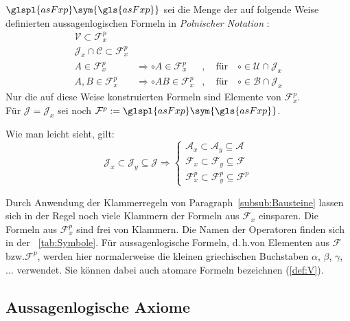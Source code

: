 \documentclass[english,ngerman,parskip=half,headsepline,footsepline,
	fleqn,notitlepage]{scrreprt}
\makeatletter
\newcommand*{\metaimp}{\Rightarrow}%
\newcommand*{\defeq}{:=}%
\newcommand*{\asA}{\mathcal{A}}%
\newcommand*{\asAx}{\mathcal{A}_x}%
\newcommand*{\asAy}{\mathcal{A}_y}%
\newcommand*{\asB}{\mathcal{B}}%
\newcommand*{\asC}{\mathcal{C}}%
\newcommand*{\asF}{\mathcal{F}}%
\newcommand*{\asFp}{\mathcal{F}^p}%
\newcommand*{\asFx}{\mathcal{F}_x}%
\newcommand*{\asFxp}{\mathcal{F}_x^p}%
\newcommand*{\asFy}{\mathcal{F}_y}%
\newcommand*{\asFyp}{\mathcal{F}_y^p}%
\newcommand*{\asJ}{\mathcal{J}}%
\newcommand*{\asJx}{\mathcal{J}_x}%
\newcommand*{\asJy}{\mathcal{J}_y}%
\newcommand*{\asU}{\mathcal{U}}%
\newcommand*{\asV}{\mathcal{V}}%
\newcommand*{\subsubsectionname}{Paragraph}
\newcommand*{\textbzw}{bzw.\@ }
\newcommand*{\textdh}{d.\@\,h.\@ }
\newcommand*{\glsSym}[1]{\glspl{#1}\sym{\gls{#1}}}%
\makeatother
\begin{document}
	$\glsSym{asFxp}$ sei die Menge der auf folgende Weise definierten
	aussagenlogischen Formeln in \emph{Polnischer Notation}%
	:
	\begin{align}
		\asV            \subset  \asFxp
		\\
		\asJx \cap \asC \subset  \asFxp
		\\
		A                    \in \asFxp
		& \metaimp \circ A   \in \asFxp
		& , \quad \text{für} \quad \circ \in \asU \cap \asJx
		\\
		A, B                 \in \asFxp
		& \metaimp \circ A B \in \asFxp
		& , \quad \text{für} \quad \circ \in \asB \cap \asJx
	\end{align}
	Nur die auf diese Weise konstruierten Formeln sind Elemente von $\asFxp$.
	\\Für $\asJ = \asJx$ sei noch $\asFp \defeq \glsSym{asFxp}$.

	Wie man leicht sieht, gilt:
	\begin{equation}
		\asJx \subset \asJy \subseteq \asJ \metaimp
		\begin{cases}
			\asAx  \subset \asAy  \subseteq \asA \\
			\asFx  \subset \asFy  \subseteq \asF \\
			\asFxp \subset \asFyp \subseteq \asFp
		\end{cases}
	\end{equation}

	Durch Anwendung der Klammerregeln von
	\subsubsectionname~\vref{subsub:Bausteine}
	lassen sich in der Regel noch viele Klammern
	der Formeln aus $\asFx$ einsparen.
	Die Formeln aus $\asFxp$ sind frei von Klammern.
	Die Namen der Operatoren finden sich in der \tablename~\vref{tab:Symbole}.
	Für aussagenlogische Formeln,
	\textdh von Elementen aus $\asF$ \textbzw $\asFp$,
	werden hier normalerweise die kleinen griechischen Buchstaben
	$\alpha$, $\beta$, $\gamma$, $\dots$ verwendet.
	Sie können dabei auch atomare Formeln bezeichnen (\seename \eqref{def:V}).

	\subsection{Aussagenlogische Axiome}%
	\label{sub:logAxiome}

\end{document}
